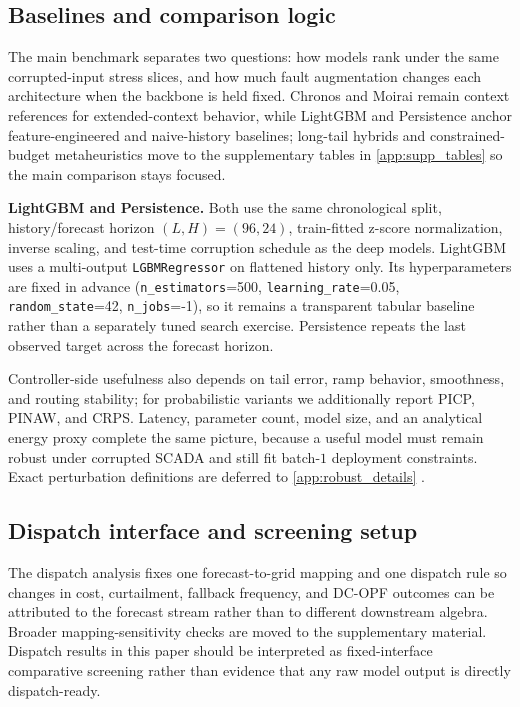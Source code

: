 ﻿\documentclass[review,1p,times]{elsarticle}
\begin{document}
\subsection{Baselines and comparison logic}
\label{sec:robust_protocol}

The main benchmark separates two questions: how models rank under the same corrupted-input stress slices, and how much fault augmentation changes each architecture when the backbone is held fixed. Chronos and Moirai remain context references for extended-context behavior, while LightGBM and Persistence anchor feature-engineered and naive-history baselines; long-tail hybrids and constrained-budget metaheuristics move to the supplementary tables in \ref{app:supp_tables} so the main comparison stays focused.

\noindent\textbf{LightGBM and Persistence.} Both use the same chronological split, history/forecast horizon $(L,H)=(96,24)$, train-fitted z-score normalization, inverse scaling, and test-time corruption schedule as the deep models. LightGBM uses a multi-output \texttt{LGBMRegressor} on flattened history only. Its hyperparameters are fixed in advance (\texttt{n\_estimators}=500, \texttt{learning\_rate}=0.05, \texttt{random\_state}=42, \texttt{n\_jobs}=-1), so it remains a transparent tabular baseline rather than a separately tuned search exercise. Persistence repeats the last observed target across the forecast horizon.

Controller-side usefulness also depends on tail error, ramp behavior, smoothness, and routing stability; for probabilistic variants we additionally report PICP, PINAW, and CRPS. Latency, parameter count, model size, and an analytical energy proxy complete the same picture, because a useful model must remain robust under corrupted SCADA and still fit batch-$1$ deployment constraints. Exact perturbation definitions are deferred to \ref{app:robust_details} \cite{schwartz2020greenai,strubell2019energy}.

\subsection{Dispatch interface and screening setup}
\label{subsec:dispatch_setup}
The dispatch analysis fixes one forecast-to-grid mapping and one dispatch rule so changes in cost, curtailment, fallback frequency, and DC-OPF outcomes can be attributed to the forecast stream rather than to different downstream algebra. Broader mapping-sensitivity checks are moved to the supplementary material.
Dispatch results in this paper should be interpreted as fixed-interface comparative screening rather than evidence that any raw model output is directly dispatch-ready.
\end{document}
